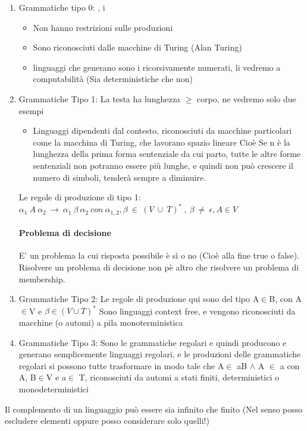 \documentclass[12pt, a4paper, openany, oneside]{book}
\begin{document}
\begin{enumerate}
	\item Grammatiche tipo 0: , i 	
	\begin{itemize}
		\item Non hanno restrizioni sulle produzioni
		\item Sono riconosciuti dalle macchine di Turing (Alan Turing)
		\item linguaggi che generano sono i ricorsivamente numerati, li vedremo a 
		computabilità (Sia deterministiche che non)
	\end{itemize}
	\item Grammatiche Tipo 1: La testa ha lunghezza $\geq$ corpo, ne vedremo 
	solo due esempi
	\begin{itemize}
		\item Linguaggi dipendenti dal contesto, riconosciuti da macchine 
		particolari come la macchina di Turing, che lavorano spazio lineare
		Cioè Se n è la lunghezza della prima forma sentenziale da cui parto, 
		tutte le altre forme sentenziali non potranno essere più lunghe, e quindi
		non può crescere il numero di simboli, tenderà sempre a diminuire.
	\end{itemize}
	Le regole di produzione di tipo 1:
	$\alpha _{1} ~ A ~ \alpha _{2} ~ \to ~ \alpha _{1}~ \beta ~ \alpha_{2} ~ con ~ \alpha _{1,2}
	,\beta ~ \in ~ (V ~ \cup ~ T)^{*} ~ , ~ \beta ~ \neq ~ \epsilon, A\in V$
	\paragraph{Problema di decisione} E' un problema la cui risposta possibile è
	sì o no (Cioè alla fine true o false). Risolvere un problema di decisione non 
	pè altro che risolvere un problema di membership.
	\item Grammatiche Tipo 2: 
	Le regole di produzione qui sono del tipo A$\in$B, con A$\in$V e 
	$\beta \in(V \cup T)^{*}$
	Sono linguaggi context free, e vengono riconosciuti da macchine (o automi) a
	pila monoterministica
	\item Grammatiche Tipo 3: Sono le grammatiche regolari e quindi producono e
	generano semplicemente linguaggi regolari, e le produzioni delle grammatiche
	regolari si possono tutte trasformare in modo tale che A$\in$ aB $\wedge$ A
	$\in$ a con A, B$\in$V e a$\in$ T, riconosciuti da automi a stati finiti, 
	deterministici o monodeterministici
\end{enumerate}
Il complemento di un linguaggio può essere sia infinito che finito (Nel senso
posso escludere elementi oppure posso considerare solo quelli!)
\\ \\ 
\end{document}

